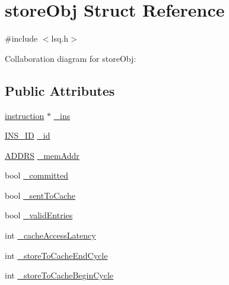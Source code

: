 \hypertarget{structstoreObj}{
\section{storeObj Struct Reference}
\label{structstoreObj}
}


{\ttfamily \#include $<$lsq.h$>$}



Collaboration diagram for storeObj:
\subsection*{Public Attributes}
\begin{DoxyCompactItemize}
\item 
\hyperlink{classinstruction}{instruction} $\ast$ \hyperlink{structstoreObj_a418139c33f75b4d7700a61b0293518d7}{\_\-ins}
\item 
\hyperlink{global_2global_8h_a1883c47d0023d0f200e1d86eced6a070}{INS\_\-ID} \hyperlink{structstoreObj_a993d37ba4f085950507c05564bf99a6a}{\_\-id}
\item 
\hyperlink{global_2global_8h_a7ea74bb9ffd2e4d41550ae2383dd25bc}{ADDRS} \hyperlink{structstoreObj_ae4b43c4c368bb40a153821ae78f0958a}{\_\-memAddr}
\item 
bool \hyperlink{structstoreObj_a3082afbcdd75cdc3b09c9faadf0a3941}{\_\-committed}
\item 
bool \hyperlink{structstoreObj_a89e607394f02de57bd383ec70f79c1d9}{\_\-sentToCache}
\item 
bool \hyperlink{structstoreObj_a6f4f02339e252cf86524f581afb11ae9}{\_\-validEntries}
\item 
int \hyperlink{structstoreObj_a846024761d730594e3cef0d1292ddccb}{\_\-cacheAccessLatency}
\item 
int \hyperlink{structstoreObj_a585c7233f7b85b3c56ebba2a0300f037}{\_\-storeToCacheEndCycle}
\item 
int \hyperlink{structstoreObj_abe633ee683418741766efe4ad0ba1fac}{\_\-storeToCacheBeginCycle}
\end{DoxyCompactItemize}


